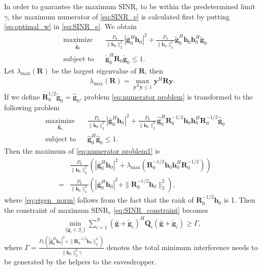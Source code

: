 \documentclass[journal]{IEEEtran}
\begin{document}
In order to guarantee the maximum $\mathrm{SINR}_e$ to be within the predetermined limit $\gamma$, the maximum numerator of \eqref{eq:SINR_e} is calculated first by putting \eqref{eq:optimal_w} in \eqref{eq:SINR_e}. We obtain
\begin{equation}
\begin{aligned} \label{eq:numerator problem}
& \underset{\tilde{\mathbf{g}}_{0}}{\text{maximize}}
& & \frac{P_0}{\|\mathbf{h}_0\|_2^2}|\bar{\mathbf{g}}_0^H\mathbf{h}_0|^2 +\frac{P_0}{\|\mathbf{h}_0\|_2^2} \tilde{\mathbf{g}}_0^H\mathbf{h}_0\mathbf{h}_0^H\tilde{\mathbf{g}}_0 \\
& \text{subject to}
& & \tilde{\mathbf{g}}_0^H\mathbf{R}_0\tilde{\mathbf{g}}_0 \leq 1.
\end{aligned}
\end{equation}
Let $\lambda_{\mathrm{max}}(\mathbf{R})$ be the largest eigenvalue of $\mathbf{R}$, then
\begin{eqnarray}
\lambda_{\mathrm{max}}(\mathbf{R})= \max_{\mathbf{y}^H\mathbf{y} \leq 1} \mathbf{y}^H\mathbf{R}\mathbf{y}.
\end{eqnarray}
If we define $\mathbf{R}_0^{1/2}\tilde{\mathbf{g}}_0 = \hat{\mathbf{g}}_0$, problem \eqref{eq:numerator problem} is transformed to the following problem
\begin{equation}
\begin{aligned} \label{eq:numerator problem1}
& \underset{\hat{\mathbf{g}}_{0}}{\text{maximize}}
& & \frac{P_0}{\|\mathbf{h}_0\|_2^2}|\bar{\mathbf{g}}_0^H\mathbf{h}_0|^2 +\frac{P_0}{\|\mathbf{h}_0\|_2^2} \hat{\mathbf{g}}_0^H\mathbf{R}_0^{-1/2}\mathbf{h}_0\mathbf{h}_0^H\mathbf{R}_0^{-1/2}\hat{\mathbf{g}}_0 \\
& \text{subject to}
& & \hat{\mathbf{g}}_0^H\hat{\mathbf{g}}_0 \leq 1.
\end{aligned}
\end{equation}
Then the maximum of \eqref{eq:numerator problem1} is
\begin{eqnarray}
&&\frac{P_0}{\|\mathbf{h}_0\|_2^2}\left(|\bar{\mathbf{g}}_0^H\mathbf{h}_0|^2 + \lambda_{\mathrm{max}}(\mathbf{R}_0^{-1/2}\mathbf{h}_0\mathbf{h}_0^H\mathbf{R}_0^{-1/2})\right)\\
&=&\frac{P_0}{\|\mathbf{h}_0\|_2^2}\left(|\bar{\mathbf{g}}_0^H\mathbf{h}_0|^2 + \|\mathbf{R}_0^{-1/2}\mathbf{h}_0\|_2^2\right)\label{eq:eigen_norm},
\end{eqnarray} 
where \eqref{eq:eigen_norm} follows from the fact that the rank of $\mathbf{R}_0^{-1/2}\mathbf{h}_0$ is 1. Then the constraint of maximum $\mathrm{SINR}_e$ \eqref{eq:SINR_constraint}  becomes
\begin{eqnarray} \label{eq:sum_noise}
\min_{\{\tilde{\mathbf{g}}_i \in \mathcal{G}_i\}}\sum_{i=1}^{N}(\bar{\mathbf{g}}+\tilde{\mathbf{g}}_i)^H\mathbf{Q}_i(\bar{\mathbf{g}}+\tilde{\mathbf{g}}_i) \geq \Gamma  \label{eq:artificial noise constraint},
\end{eqnarray}
where $\Gamma =\frac{P_0\left(|\bar{\mathbf{g}}_0^H\mathbf{h}_0|^2 + \|\mathbf{R}_0^{-1/2}\mathbf{h}_0\|_2^2\right)}{\|\mathbf{h}_0\|_2^2\gamma}$ denotes the total minimum interference needs to be generated by the helpers to the eavesdropper. 
\end{document}

